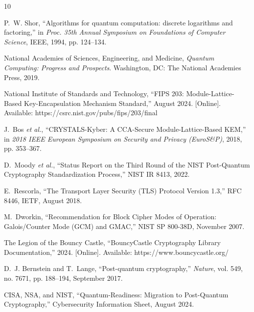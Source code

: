 \documentclass[conference]{IEEEtran}
\begin{document}
\begin{thebibliography}{10}

P.~W. Shor, ``Algorithms for quantum computation: discrete logarithms and factoring,'' in \emph{Proc. 35th Annual Symposium on Foundations of Computer Science}, IEEE, 1994, pp. 124--134.

National Academies of Sciences, Engineering, and Medicine, \emph{Quantum Computing: Progress and Prospects}. Washington, DC: The National Academies Press, 2019.

National Institute of Standards and Technology, ``FIPS 203: Module-Lattice-Based Key-Encapsulation Mechanism Standard,'' August 2024. [Online]. Available: https://csrc.nist.gov/pubs/fips/203/final

J.~Bos \emph{et al.}, ``CRYSTALS-Kyber: A CCA-Secure Module-Lattice-Based KEM,'' in \emph{2018 IEEE European Symposium on Security and Privacy (EuroS\&P)}, 2018, pp. 353--367.

D.~Moody \emph{et al.}, ``Status Report on the Third Round of the NIST Post-Quantum Cryptography Standardization Process,'' NIST IR 8413, 2022.

E.~Rescorla, ``The Transport Layer Security (TLS) Protocol Version 1.3,'' RFC 8446, IETF, August 2018.

M.~Dworkin, ``Recommendation for Block Cipher Modes of Operation: Galois/Counter Mode (GCM) and GMAC,'' NIST SP 800-38D, November 2007.

The Legion of the Bouncy Castle, ``BouncyCastle Cryptography Library Documentation,'' 2024. [Online]. Available: https://www.bouncycastle.org/

D.~J. Bernstein and T.~Lange, ``Post-quantum cryptography,'' \emph{Nature}, vol. 549, no. 7671, pp. 188--194, September 2017.

CISA, NSA, and NIST, ``Quantum-Readiness: Migration to Post-Quantum Cryptography,'' Cybersecurity Information Sheet, August 2024.

\end{thebibliography}
\end{document}
